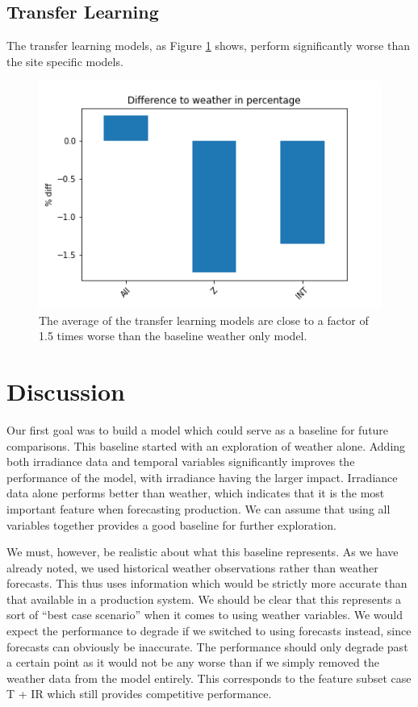 \documentclass[11pt, fullpage,letterpaper]{article}
\begin{document}
\subsection{Transfer Learning}

The transfer learning models, as Figure \ref{4-3} shows, perform significantly worse than the site specific models. 
\begin{figure}[!htb]
    \centering
    \includegraphics[scale=0.75]{../plots/regression_report/4-3}
    \caption{
        The average of the transfer learning models are close to a factor of 1.5 times worse than the baseline weather only model.
    }
    \label{4-3}
\end{figure}


\FloatBarrier

\section{Discussion}

Our first goal was to build a model which could serve as a baseline for future comparisons. This baseline started with an exploration of weather alone. Adding both irradiance data and temporal variables significantly improves the performance of the model, with irradiance having the larger impact. Irradiance data alone performs better than weather, which indicates that it is the most important feature when forecasting production. We can assume that using all variables together provides a good baseline for further exploration. 

We must, however, be realistic about what this baseline represents. As we have already noted, we used historical weather observations rather than weather forecasts. This thus uses information which would be strictly more accurate than that available in a production system. We should be clear that this represents a sort of “best case scenario” when it comes to using weather variables. We would expect the performance to degrade if we switched to using forecasts instead, since forecasts can obviously be inaccurate. The performance should only degrade past a certain point as it would not be any worse than if we simply removed the weather data from the model entirely. This corresponds to the feature subset case T + IR which still provides competitive performance.
\end{document}
